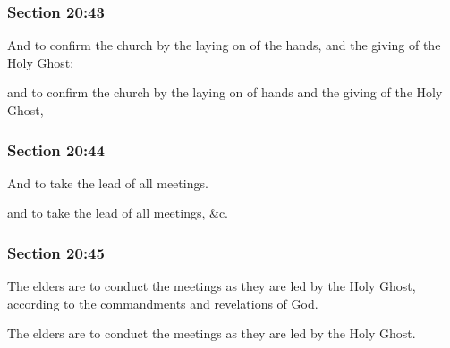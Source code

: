 	\subsubsection{Section 20:43} %
		\label{DC20-43}

		And to confirm the church by the laying on of the hands, and the giving of the Holy Ghost;

		\begin{framed}
		\scriptsize
			\begin{compactdesc}
				\item[JSP] and to confirm the church by the laying on of hands and the giving of the Holy Ghost,
				\item[RB1] 
				\item[BC] 
			\end{compactdesc}
		\end{framed}

	\subsubsection{Section 20:44} %
		\label{DC20-44}

		And to take the lead of all meetings.

		\begin{framed}
		\scriptsize
			\begin{compactdesc}
				\item[JSP] and to take the lead of all meetings, \&c.
				\item[RB1] 
				\item[BC] 
			\end{compactdesc}
		\end{framed}

	\subsubsection{Section 20:45} %
		\label{DC20-45}

		The elders are to conduct the meetings as they are led by the Holy Ghost, according to the commandments and revelations of God.

		\begin{framed}
		\scriptsize
			\begin{compactdesc}
				\item[JSP] The elders are to conduct the meetings as they are led by the Holy Ghost.
				\item[RB1] 
				\item[BC] 
			\end{compactdesc}
		\end{framed}


